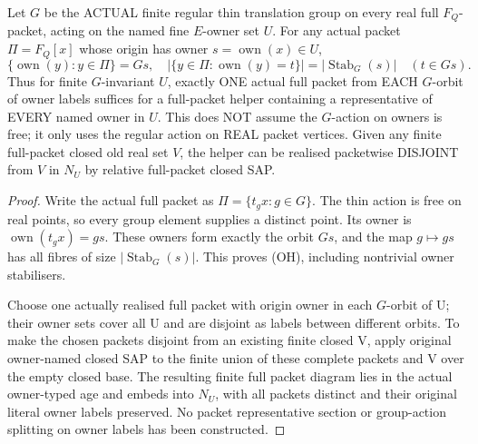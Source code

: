 \begin{lemma}
\label{lem:orbit-safe-owner-helper}
Let $G$ be the ACTUAL finite regular
thin translation group on every
real full $F_Q$-packet, acting on
the named fine $E$-owner set $U$.
For any actual packet $\Pi=F_Q[x]$
whose origin has owner
$s=\operatorname{own}(x)\in U$,
\[
 \{\operatorname{own}(y):y\in\Pi\}=G s,
 \quad
 |\{y\in\Pi:\operatorname{own}(y)=t\}|
        =|\operatorname{Stab}_G(s)|
       \quad(t\in Gs).
\tag{OH}\label{eq:orbit-safe-owner-helper}
\]
Thus for finite $G$-invariant
$U$, exactly ONE actual full
packet from EACH $G$-orbit
of owner labels suffices for
a full-packet helper containing
a representative of EVERY
named owner in $U$. This
does NOT assume the $G$-action
on owners is free; it only uses
the regular action on REAL
packet vertices. Given any
finite full-packet closed
old real set $V$, the helper
can be realised packetwise
DISJOINT from $V$ in $N_U$
by relative full-packet
closed SAP.
\end{lemma}
\begin{proof}
Write the actual full packet
as $\Pi=\{t_gx:g\in G\}$.
The thin action is free on
real points, so every group
element supplies a distinct
point. Its owner is
$\operatorname{own}(t_gx)=gs$.
These owners form exactly
the orbit $Gs$, and the map
$g\mapsto gs$ has all fibres
of size
$|\operatorname{Stab}_G(s)|$.
This proves (OH), including
nontrivial owner stabilisers.

Choose one actually realised
full packet with origin owner
in each $G$-orbit of U;
their owner sets cover all U
and are disjoint as labels
between different orbits.
To make the chosen packets
disjoint from an existing
finite closed V, apply original
owner-named closed SAP to
the finite union of these
complete packets and V
over the empty closed base.
The resulting finite full
packet diagram lies in
the actual owner-typed age
and embeds into $N_U$,
with all packets distinct
and their original literal
owner labels preserved.
No packet representative
section or group-action
splitting on owner labels
has been constructed.
\end{proof}

